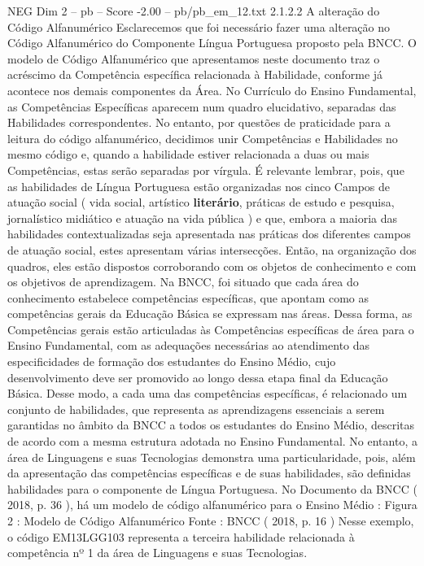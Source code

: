 \begin{textsample}{NEG Dim 2 – pb – Score -2.00 – pb/pb\_em\_12.txt}  \label{ex:f2_neg_006}
2.1.2.2 A alteração do Código Alfanumérico Esclarecemos que foi necessário fazer uma alteração no Código Alfanumérico do Componente Língua Portuguesa proposto pela BNCC.
O modelo de Código Alfanumérico que apresentamos neste documento traz o acréscimo da Competência específica relacionada à Habilidade, conforme já acontece nos demais componentes da Área.
No Currículo do Ensino Fundamental, as Competências Específicas aparecem num quadro elucidativo, separadas das Habilidades correspondentes.
No entanto, por questões de praticidade para a leitura do código alfanumérico, decidimos unir Competências e Habilidades no mesmo código e, quando a habilidade estiver relacionada a duas ou mais Competências, estas serão separadas por vírgula.
É relevante lembrar, pois, que as habilidades de Língua Portuguesa estão organizadas nos cinco Campos de atuação social ( vida social, artístico \textbf{literário}, práticas de estudo e pesquisa, jornalístico midiático e atuação na vida pública ) e que, embora a maioria das habilidades contextualizadas seja apresentada nas práticas dos diferentes campos de atuação social, estes apresentam várias intersecções.
Então, na organização dos quadros, eles estão dispostos corroborando com os objetos de conhecimento e com os objetivos de aprendizagem.
Na BNCC, foi situado que cada área do conhecimento estabelece competências específicas, que apontam como as competências gerais da Educação Básica se expressam nas áreas.
Dessa forma, as Competências gerais estão articuladas às Competências específicas de área para o Ensino Fundamental, com as adequações necessárias ao atendimento das especificidades de formação dos estudantes do Ensino Médio, cujo desenvolvimento deve ser promovido ao longo dessa etapa final da Educação Básica.
Desse modo, a cada uma das competências específicas, é relacionado um conjunto de habilidades, que representa as aprendizagens essenciais a serem garantidas no âmbito da BNCC a todos os estudantes do Ensino Médio, descritas de acordo com a mesma estrutura adotada no Ensino Fundamental.
No entanto, a área de Linguagens e suas Tecnologias demonstra uma particularidade, pois, além da apresentação das competências específicas e de suas habilidades, são definidas habilidades para o componente de Língua Portuguesa.
No Documento da BNCC ( 2018, p. 36 ), há um modelo de código alfanumérico para o Ensino Médio : Figura 2 : Modelo de Código Alfanumérico Fonte : BNCC ( 2018, p. 16 ) Nesse exemplo, o código EM13LGG103 representa a terceira habilidade relacionada à competência nº 1 da área de Linguagens e suas Tecnologias.

\end{textsample}
